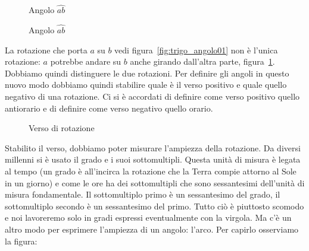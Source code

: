 \begin{figure}[!h]
 \begin{minipage}[t]{.45\textwidth}
\begin{inaccessibleblock}
\centering
 
 \caption{Angolo $\widehat{ab}$}
 \label{fig:trigo_angolo01}
\end{inaccessibleblock}
 \end{minipage}
 \begin{minipage}[t]{.45\textwidth}
\begin{inaccessibleblock}
\centering
 
 \caption{Angolo $\widehat{ab}$}
 \label{fig:trigo_angolo02}
\end{inaccessibleblock}
 \end{minipage}
\end{figure}

La rotazione che porta $a$ su $b$ vedi figura~\ref{fig:trigo_angolo01} non è 
l'unica rotazione: $a$ potrebbe andare su $b$ anche girando dall'altra 
parte, figura~\ref{fig:trigo_angolo02}. Dobbiamo quindi distinguere le due 
rotazioni.
Per definire gli angoli in questo nuovo modo dobbiamo quindi stabilire quale è 
il verso positivo e quale quello negativo di una rotazione. 
Ci si è accordati di definire come verso positivo quello antiorario e di 
definire come verso negativo quello orario.

\begin{wrapfigure}{r}{0.5\textwidth} 
 \vspace{-6pt}
  \begin{center}
  \begin{minipage}{.3\textwidth}
\begin{inaccessibleblock}
    
    \caption{Verso di rotazione}
    \label{fig:trigo_verso_rotazioni}
\end{inaccessibleblock}
  \end{minipage}
  \end{center}
   \vspace{-12pt}
  \vspace{1pt}
\end{wrapfigure} 

Stabilito il verso, dobbiamo poter misurare l'ampiezza della rotazione. 
Da diversi millenni si è usato il grado e i suoi sottomultipli. 
Questa unità di misura è legata al tempo (un grado è all'incirca la rotazione 
che la Terra compie attorno al Sole in un giorno) e come le ore ha dei 
sottomultipli che sono sessantesimi dell'unità di misura fondamentale. 
Il sottomultiplo primo è un sessantesimo del grado, il sottomultiplo secondo 
è un sessantesimo del primo. 
Tutto ciò è piuttosto scomodo e noi lavoreremo solo in gradi espressi 
eventualmente con la virgola. Ma c'è un altro modo per esprimere l'ampiezza 
di un angolo: l'arco. Per capirlo osserviamo la figura:

